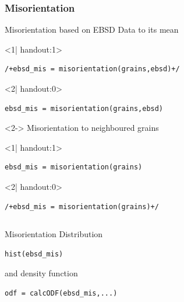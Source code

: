 \begin{frame}[fragile]
  \frametitle{Misorientation}


Misorientation based on EBSD Data to its mean

\begin{onlyenv}<1| handout:1>
\begin{lstlisting}
/+ebsd_mis = misorientation(grains,ebsd)+/
\end{lstlisting}
\end{onlyenv}
\begin{onlyenv}<2| handout:0>
\begin{lstlisting}
ebsd_mis = misorientation(grains,ebsd)
\end{lstlisting}
\end{onlyenv}

\begin{uncoverenv}<2->
\medskip
Misorientation to neighboured grains
\begin{onlyenv}<1| handout:1>
\begin{lstlisting}
ebsd_mis = misorientation(grains)
\end{lstlisting}
\end{onlyenv}
\begin{onlyenv}<2| handout:0>
\begin{lstlisting}
/+ebsd_mis = misorientation(grains)+/
\end{lstlisting}
\end{onlyenv}

\end{uncoverenv}

\begin{columns}[t]
\begin{column}[T]{6.25cm}
\medskip
Misorientation Distribution
\begin{lstlisting}
hist(ebsd_mis)
\end{lstlisting}

and density function
\begin{lstlisting}
odf = calcODF(ebsd_mis,...)
\end{lstlisting}


\end{column}
\end{columns}
\end{frame}
